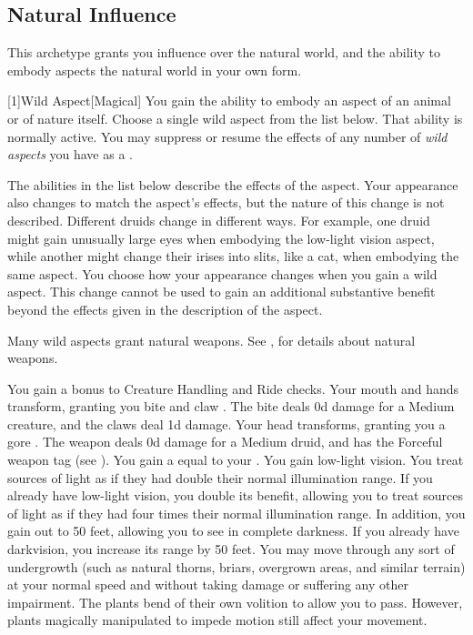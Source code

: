     \subsection{Natural Influence}
        This archetype grants you influence over the natural world, and the ability to embody aspects the natural world in your own form.

        [1]{Wild Aspect}[Magical]
        You gain the ability to embody an aspect of an animal or of nature itself.
        Choose a single wild aspect from the list below.
        That ability is normally active.
        You may suppress or resume the effects of any number of \textit{wild aspects} you have as a .

        The abilities in the list below describe the effects of the aspect.
        Your appearance also changes to match the aspect's effects, but the nature of this change is not described.
        Different druids change in different ways.
        For example, one druid might gain unusually large eyes when embodying the low-light vision aspect, while another might change their irises into slits, like a cat, when embodying the same aspect.
        You choose how your appearance changes when you gain a wild aspect.
        This change cannot be used to gain an additional substantive benefit beyond the effects given in the description of the aspect.

        Many wild aspects grant natural weapons.
        See , for details about natural weapons.

        {
            You gain a  bonus to Creature Handling and Ride checks.
            Your mouth and hands transform, granting you bite and claw .
            The bite deals \plus0d damage for a Medium creature, and the claws deal \minus1d damage.
            Your head transforms, granting you a gore .
            The weapon deals \plus0d damage for a Medium druid, and has the Forceful weapon tag (see ).
            You gain a  equal to your .
            You gain low-light vision.
            You treat sources of light as if they had double their normal illumination range.
            If you already have low-light vision, you double its benefit, allowing you to treat sources of light as if they had four times their normal illumination range.
            In addition, you gain  out to 50 feet, allowing you to see in complete darkness.
            If you already have darkvision, you increase its range by 50 feet.
            You may move through any sort of undergrowth (such as natural thorns, briars, overgrown areas, and similar terrain) at your normal speed and without taking damage or suffering any other impairment.
            The plants bend of their own volition to allow you to pass.
            However, plants magically manipulated to impede motion still affect your movement.
        }

